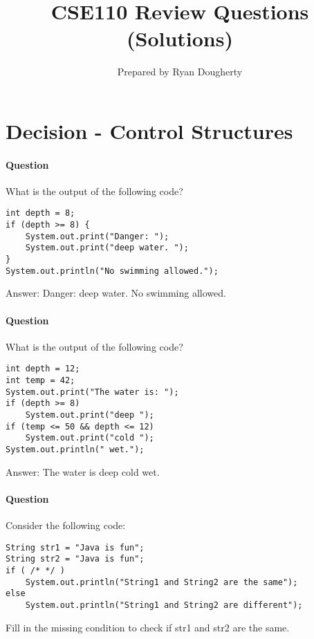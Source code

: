 \documentclass{article}
\title{CSE110 Review Questions (Solutions)}
\author{Prepared by Ryan Dougherty}
\date{}
\begin{document}
\maketitle

\section{Decision - Control Structures}


\setcounter{question_num}{1}
\paragraph{Question }
What is the output of the following code?
\begin{lstlisting}
int depth = 8;
if (depth >= 8) {
	System.out.print("Danger: ");
	System.out.print("deep water. ");
}
System.out.println("No swimming allowed.");
\end{lstlisting}
{\color{red}Answer: Danger: deep water. No swimming allowed.}

\addtocounter{question_num}{1}
\paragraph{Question }
What is the output of the following code?
\begin{lstlisting}
int depth = 12;
int temp = 42;
System.out.print("The water is: ");
if (depth >= 8)
	System.out.print("deep ");
if (temp <= 50 && depth <= 12)
	System.out.print("cold ");
System.out.println(" wet.");
\end{lstlisting}
{\color{red}Answer: The water is deep cold wet.}

\addtocounter{question_num}{1}
\paragraph{Question }
Consider the following code:
\begin{lstlisting}
String str1 = "Java is fun";
String str2 = "Java is fun";
if ( /* */ )
	System.out.println("String1 and String2 are the same");
else
	System.out.println("String1 and String2 are different");
\end{lstlisting}
Fill in the missing condition to check if str1 and str2 are the same.
\end{document}
